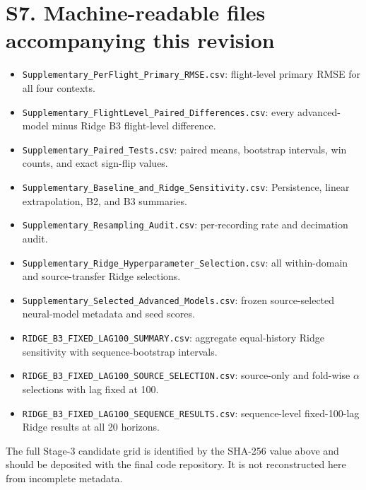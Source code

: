 \documentclass[11pt]{article}
\begin{document}
\section*{S7. Machine-readable files accompanying this revision}
\begin{itemize}
\item \texttt{Supplementary\_PerFlight\_Primary\_RMSE.csv}: flight-level primary RMSE for all four contexts.
\item \texttt{Supplementary\_FlightLevel\_Paired\_Differences.csv}: every advanced-model minus Ridge B3 flight-level difference.
\item \texttt{Supplementary\_Paired\_Tests.csv}: paired means, bootstrap intervals, win counts, and exact sign-flip values.
\item \texttt{Supplementary\_Baseline\_and\_Ridge\_Sensitivity.csv}: Persistence, linear extrapolation, B2, and B3 summaries.
\item \texttt{Supplementary\_Resampling\_Audit.csv}: per-recording rate and decimation audit.
\item \texttt{Supplementary\_Ridge\_Hyperparameter\_Selection.csv}: all within-domain and source-transfer Ridge selections.
\item \texttt{Supplementary\_Selected\_Advanced\_Models.csv}: frozen source-selected neural-model metadata and seed scores.
\item \texttt{RIDGE\_B3\_FIXED\_LAG100\_SUMMARY.csv}: aggregate equal-history Ridge sensitivity with sequence-bootstrap intervals.
\item \texttt{RIDGE\_B3\_FIXED\_LAG100\_SOURCE\_SELECTION.csv}: source-only and fold-wise $\alpha$ selections with lag fixed at 100.
\item \texttt{RIDGE\_B3\_FIXED\_LAG100\_SEQUENCE\_RESULTS.csv}: sequence-level fixed-100-lag Ridge results at all 20 horizons.
\end{itemize}
\noindent The full Stage-3 candidate grid is identified by the SHA-256 value above and should be deposited with the final code repository. It is not reconstructed here from incomplete metadata.
\end{document}
